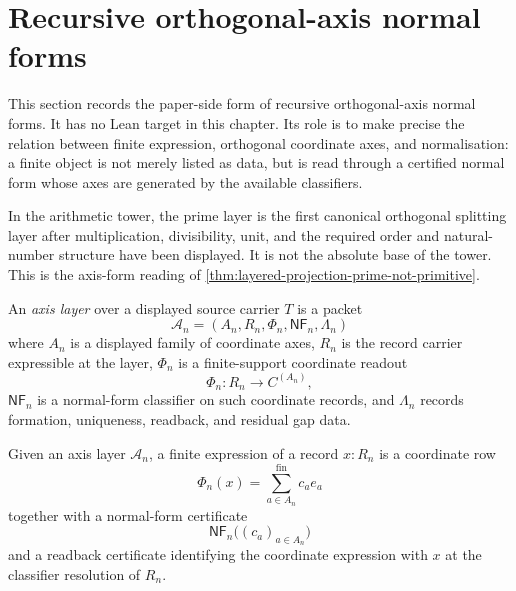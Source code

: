 \section{Recursive orthogonal-axis normal forms}
\label{sec:recursive-orthogonal-axis-normal-forms}

\begin{remark}
\label{rem:recursive-orthogonal-axis-normal-forms-status}
This section records the paper-side form of recursive orthogonal-axis
normal forms. It has no Lean target in this chapter. Its role is to
make precise the relation between finite expression, orthogonal
coordinate axes, and normalisation: a finite object is not merely listed
as data, but is read through a certified normal form whose axes are
generated by the available classifiers.
\end{remark}

\begin{principle}
\label{prin:prime-not-absolute-first-axis-layer}
In the arithmetic tower, the prime layer is the first canonical
orthogonal splitting layer after multiplication, divisibility, unit, and
the required order and natural-number structure have been displayed. It
is not the absolute base of the tower. This is the axis-form reading of
\autoref{thm:layered-projection-prime-not-primitive}.
\end{principle}

\begin{definition}
\label{def:recursive-axis-layer}
An \emph{axis layer} over a displayed source carrier $T$ is a packet
$$
\mathcal A_n=(A_n,R_n,\Phi_n,\mathsf{NF}_n,\Lambda_n)
$$
where $A_n$ is a displayed family of coordinate axes, $R_n$ is the
record carrier expressible at the layer, $\Phi_n$ is a finite-support
coordinate readout
$$
\Phi_n:R_n\to C^{(A_n)},
$$
$\mathsf{NF}_n$ is a normal-form classifier on such coordinate records,
and $\Lambda_n$ records formation, uniqueness, readback, and residual
gap data.
\end{definition}

\begin{definition}
\label{def:finite-axis-expression}
Given an axis layer $\mathcal A_n$, a finite expression of a record
$x:R_n$ is a coordinate row
$$
\Phi_n(x)=\sum_{a\in A_n}^{\mathrm{fin}} c_a e_a
$$
together with a normal-form certificate
$$
\mathsf{NF}_n\bigl((c_a)_{a\in A_n}\bigr)
$$
and a readback certificate identifying the coordinate expression with
$x$ at the classifier resolution of $R_n$.
\end{definition}

